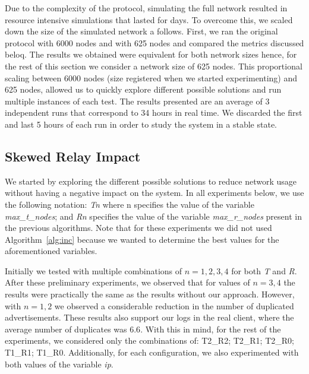 \documentclass{dads}   %
\begin{document}
Due to the complexity of the protocol, simulating the full network resulted in resource intensive simulations that lasted for days.
To overcome this, we scaled down the size of the simulated network a follows. 
First,  we ran the original protocol with 6000 nodes and with 625 nodes and compared the metrics discussed beloq. The results we obtained were equivalent for both network sizes hence, for the rest of this section we consider a network size of 625 nodes. This proportional scaling between 6000 nodes (size registered when we started experimenting) and 625 nodes, allowed us to quickly explore different possible solutions and run multiple instances of each test. The results presented are an average of 3 independent runs that correspond to 34 hours in real time. We discarded the first and last 5 hours of each run in order to study the system in a stable state.


\subsection{Skewed Relay Impact}
\label{sec:sri}
We started by exploring the different possible solutions to reduce network usage without having a negative impact on the system. In all experiments below, we use the following notation: \textsl{Tn} where n specifies the value of the variable \textsl{max\_t\_nodes}; and \textsl{Rn} specifies the value of the variable \textsl{max\_r\_nodes} present in the previous algorithms. Note that for these experiments we did not used Algorithm~\ref{alg:inc} because we wanted to determine the best values for the aforementioned variables.

Initially we tested with multiple combinations of $n={1,2,3,4}$ for both \textsl{T} and \textsl{R}. After these preliminary experiments, we observed that for values of $n={3,4}$ the results were practically the same as the results without our approach. However, with $n={1,2}$ we observed a considerable reduction in the number of duplicated advertisements.
These results also support our logs in the real client, where the average number of duplicates was $6.6$. With this in mind, for the rest of the experiments, we considered only the combinations of: T2\_R2; T2\_R1; T2\_R0; T1\_R1; T1\_R0. Additionally, for each configuration, we also experimented with both values of the variable \textsl{ip}.
\end{document}
